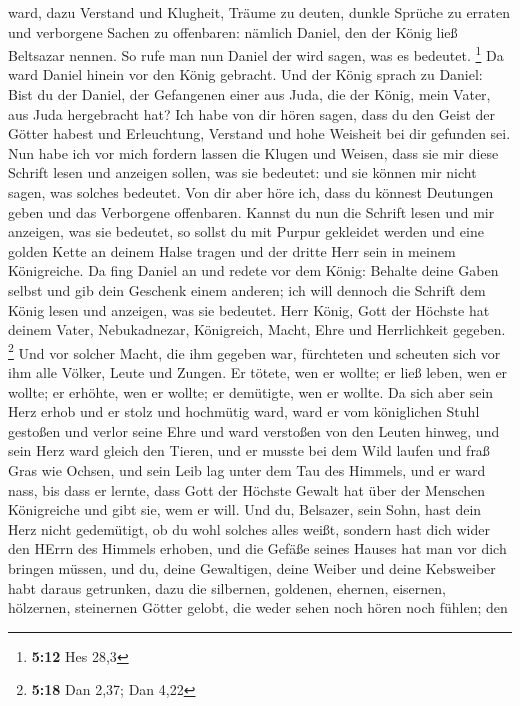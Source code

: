 ward, dazu Verstand und Klugheit, Träume zu deuten, dunkle Sprüche zu
erraten und verborgene Sachen zu offenbaren: nämlich Daniel, den der
König ließ Beltsazar nennen. So rufe man nun Daniel der wird sagen, was
es bedeutet. \footnote{\textbf{5:12} Hes 28,3}  Da ward
Daniel hinein vor den König gebracht. Und der König sprach zu Daniel:
Bist du der Daniel, der Gefangenen einer aus Juda, die der König, mein
Vater, aus Juda hergebracht hat?  Ich habe von dir hören
sagen, dass du den Geist der Götter habest und Erleuchtung, Verstand und
hohe Weisheit bei dir gefunden sei.  Nun habe ich vor mich
fordern lassen die Klugen und Weisen, dass sie mir diese Schrift lesen
und anzeigen sollen, was sie bedeutet: und sie können mir nicht sagen,
was solches bedeutet.  Von dir aber höre ich, dass du
könnest Deutungen geben und das Verborgene offenbaren. Kannst du nun die
Schrift lesen und mir anzeigen, was sie bedeutet, so sollst du mit
Purpur gekleidet werden und eine golden Kette an deinem Halse tragen und
der dritte Herr sein in meinem Königreiche.  Da fing Daniel
an und redete vor dem König: Behalte deine Gaben selbst und gib dein
Geschenk einem anderen; ich will dennoch die Schrift dem König lesen und
anzeigen, was sie bedeutet.  Herr König, Gott der Höchste
hat deinem Vater, Nebukadnezar, Königreich, Macht, Ehre und Herrlichkeit
gegeben. \footnote{\textbf{5:18} Dan 2,37; Dan 4,22}  Und
vor solcher Macht, die ihm gegeben war, fürchteten und scheuten sich vor
ihm alle Völker, Leute und Zungen. Er tötete, wen er wollte; er ließ
leben, wen er wollte; er erhöhte, wen er wollte; er demütigte, wen er
wollte.  Da sich aber sein Herz erhob und er stolz und
hochmütig ward, ward er vom königlichen Stuhl gestoßen und verlor seine
Ehre  und ward verstoßen von den Leuten hinweg, und sein
Herz ward gleich den Tieren, und er musste bei dem Wild laufen und fraß
Gras wie Ochsen, und sein Leib lag unter dem Tau des Himmels, und er
ward nass, bis dass er lernte, dass Gott der Höchste Gewalt hat über der
Menschen Königreiche und gibt sie, wem er will.  Und du,
Belsazer, sein Sohn, hast dein Herz nicht gedemütigt, ob du wohl solches
alles weißt,  sondern hast dich wider den HErrn des Himmels
erhoben, und die Gefäße seines Hauses hat man vor dich bringen müssen,
und du, deine Gewaltigen, deine Weiber und deine Kebsweiber habt daraus
getrunken, dazu die silbernen, goldenen, ehernen, eisernen, hölzernen,
steinernen Götter gelobt, die weder sehen noch hören noch fühlen; den
